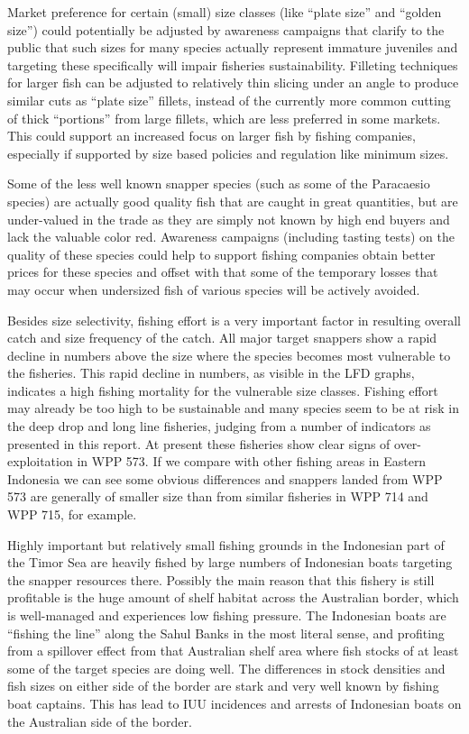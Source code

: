 Market preference for certain (small) size classes (like ``plate size'' and ``golden size'') could potentially be adjusted by awareness campaigns that clarify to the public that such sizes for many species actually represent immature juveniles and targeting these specifically will impair fisheries sustainability. Filleting techniques for larger fish can be adjusted to relatively thin slicing under an angle to produce similar cuts as ``plate size'' fillets, instead of the currently more common cutting of thick ``portions'' from large fillets, which are less preferred in some markets. This could support an increased focus on larger fish by fishing companies, especially if supported by size based policies and regulation like minimum sizes.

Some of the less well known snapper species (such as some of the Paracaesio species) are actually good quality fish that are caught in great quantities, but are under-valued in the trade as they are simply not known by high end buyers and lack the valuable color red. Awareness campaigns (including tasting tests) on the quality of these species could help to support fishing companies obtain better prices for these species and offset with that some of the temporary losses that may occur when undersized fish of various species will be actively avoided.

Besides size selectivity, fishing effort is a very important factor in resulting overall catch and size frequency of the catch. All major target snappers show a rapid decline in numbers above the size where the species becomes most vulnerable to the fisheries. This rapid decline in numbers, as visible in the LFD graphs, indicates a high fishing mortality for the vulnerable size classes. Fishing effort may already be too high to be sustainable and many species seem to be at risk in the deep drop and long line fisheries, judging from a number of indicators as presented in this report. At present these fisheries show clear signs of over-exploitation in WPP 573. If we compare with other fishing areas in Eastern Indonesia we can see some obvious differences and snappers landed from WPP 573 are generally of smaller size than from similar fisheries in WPP 714 and WPP 715, for example.

Highly important but relatively small fishing grounds in the Indonesian part of the Timor Sea are heavily fished by large numbers of Indonesian boats targeting the snapper resources there. Possibly the main reason that this fishery is still profitable is the huge amount of shelf habitat across the Australian border, which is well-managed and experiences low fishing pressure. The Indonesian boats are ``fishing the line'' along the Sahul Banks in the most literal sense, and profiting from a spillover effect from that Australian shelf area where fish stocks of at least some of the target species are doing well. The differences in stock densities and fish sizes on either side of the border are stark and very well known by fishing boat captains. This has lead to IUU incidences and arrests of Indonesian boats on the Australian side of the border.

